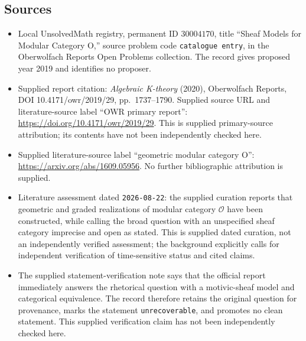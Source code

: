 \documentclass[11pt]{article}
\begin{document}
\subsection{Sources}
\begin{itemize}
\item Local UnsolvedMath registry, permanent ID \(30004170\), title ``Sheaf Models for Modular Category O,'' source problem code \texttt{catalogue entry}, in the Oberwolfach Reports Open Problems collection. The record gives proposed year 2019 and identifies no proposer.
\item Supplied report citation: \emph{Algebraic K-theory} (2020), Oberwolfach Reports, DOI 10.4171/owr/2019/29, pp.~1737--1790. Supplied source URL and literature-source label ``OWR primary report'': \url{https://doi.org/10.4171/owr/2019/29}. This is supplied primary-source attribution; its contents have not been independently checked here.
\item Supplied literature-source label ``geometric modular category O'': \url{https://arxiv.org/abs/1609.05956}. No further bibliographic attribution is supplied.
\item Literature assessment dated \texttt{2026-08-22}: the supplied curation reports that geometric and graded realizations of modular category \(\mathcal O\) have been constructed, while calling the broad question with an unspecified sheaf category imprecise and open as stated. This is supplied dated curation, not an independently verified assessment; the background explicitly calls for independent verification of time-sensitive status and cited claims.
\item The supplied statement-verification note says that the official report immediately answers the rhetorical question with a motivic-sheaf model and categorical equivalence. The record therefore retains the original question for provenance, marks the statement \texttt{unrecoverable}, and promotes no clean statement. This supplied verification claim has not been independently checked here.
\end{itemize}
\end{document}
